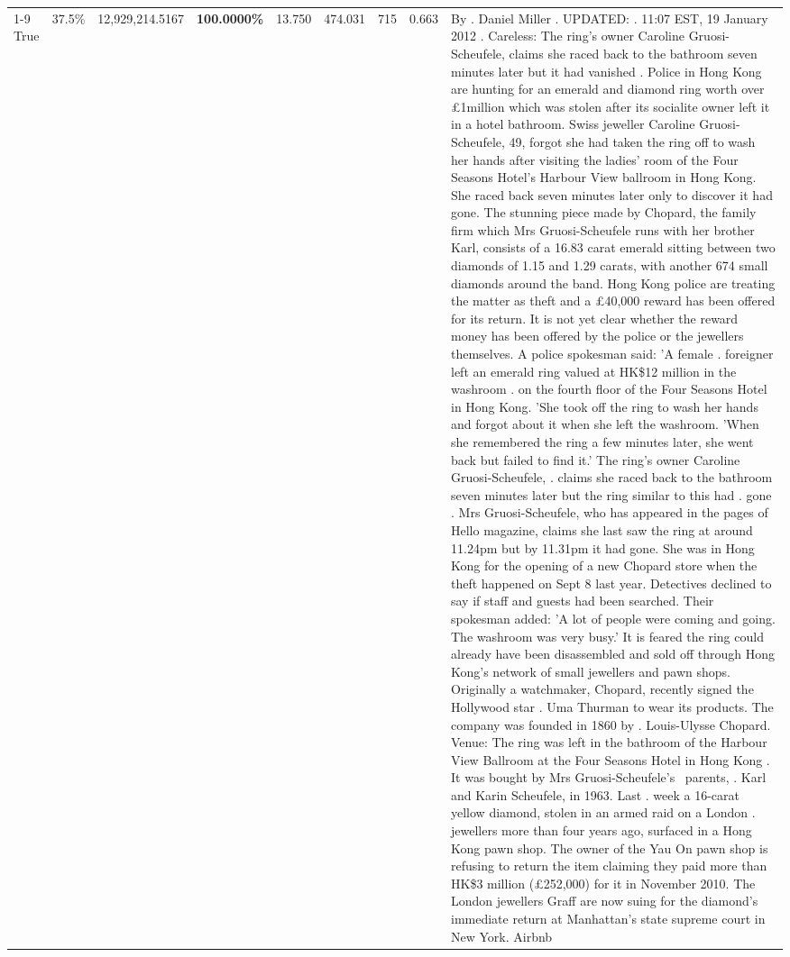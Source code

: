 \begin{table}[H]
\begin{tabular}{lllrlllll}
\cline{1-9}
True & 37.5\% & 12,929,214.5167 & \bfseries \color{red} 100.0000\% & 13.750 & 474.031 & 715 & 0.663 & By . Daniel Miller . UPDATED: . 11:07 EST, 19 January 2012 . Careless: The ring's owner Caroline Gruosi-Scheufele, claims she raced back to the bathroom seven minutes later but it had vanished . Police in Hong Kong are hunting for an emerald and diamond ring worth over £1million which was stolen after its socialite owner left it in a hotel bathroom. Swiss jeweller Caroline Gruosi-Scheufele, 49, forgot she had taken the ring off to wash her hands after visiting the ladies' room of the Four Seasons Hotel's Harbour View ballroom in Hong Kong. She raced back seven minutes later only to discover it had gone. The stunning piece made by Chopard, the family firm which Mrs Gruosi-Scheufele runs with her brother Karl, consists of a 16.83 carat emerald sitting between two diamonds of 1.15 and 1.29 carats, with another 674 small diamonds around the band. Hong Kong police are treating the matter as theft and a £40,000 reward has been offered for its return. It is not yet clear whether the reward money has been offered by the police or the jewellers themselves. A police spokesman said: 'A female . foreigner left an emerald ring valued at HK\$12 million in the washroom . on the fourth floor of the Four Seasons Hotel in Hong Kong. 'She took off the ring to wash her hands and forgot about it when she left the washroom. 'When she remembered the ring a few minutes later, she went back but failed to find it.' The ring's owner Caroline Gruosi-Scheufele, . claims she raced back to the bathroom seven minutes later but the ring similar to this had . gone . Mrs Gruosi-Scheufele, who has appeared in the pages of Hello magazine, claims she last saw the ring at around 11.24pm but by 11.31pm it had gone. She was in Hong Kong for the opening of a new Chopard store when the theft happened on Sept 8 last year. Detectives declined to say if staff and guests had been searched. Their spokesman added: 'A lot of people were coming and going. The washroom was very busy.' It is feared the ring could already have been disassembled and sold off through Hong Kong's network of small jewellers and pawn shops. Originally a watchmaker, Chopard, recently signed the Hollywood star . Uma Thurman to wear its products. The company was founded in 1860 by . Louis-Ulysse Chopard. Venue: The ring was left in the bathroom of the Harbour View Ballroom at the Four Seasons Hotel in Hong Kong . It was bought by Mrs Gruosi-Scheufele's  parents, . Karl and Karin Scheufele, in 1963. Last . week a 16-carat yellow diamond, stolen in an armed raid on a London . jewellers more than four years ago, surfaced in a Hong Kong pawn shop. The owner of the Yau On pawn shop is refusing to return the item claiming they paid more than HK\$3 million (£252,000) for it in November 2010. The London jewellers Graff are now suing for the diamond’s immediate return at Manhattan’s state supreme court in New York. Airbnb \\

\end{tabular}
\end{table}
